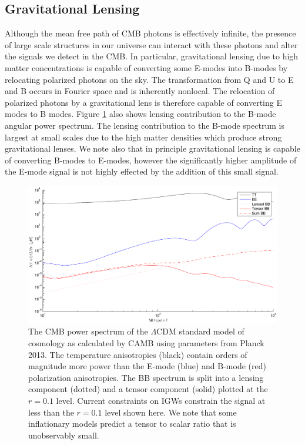 \documentclass[12pt]{article}
\begin{document}
\subsection{Gravitational Lensing}
Although the mean free path of CMB photons is effectively infinite, the
presence of large scale structures in our universe can interact with these
photons and alter the signals we detect in the CMB. In particular,
gravitational lensing due to high matter concentrations is capable of
converting some E-modes into B-modes by relocating polarized photons on the
sky. The transformation from Q and U to E and B occurs in Fourier space and is
inherently nonlocal. The relocation of polarized photons by a gravitational
lens is therefore capable of converting E modes to B modes.
Figure \ref{fig:theory_aps} also shows lensing contribution to the
B-mode angular power spectrum. The lensing contribution to the B-mode spectrum
is largest at small scales due to the high matter densities which produce
strong gravitational lenses. We note also that in principle gravitational
lensing is capable of converting B-modes to E-modes, however the significantly
higher amplitude of the E-mode signal is not highly effected by the addition
of this small signal.



\begin{figure}[ht]
	\center
	\includegraphics[width=.8\textwidth]{theory_aps.pdf}
	\caption{The CMB power spectrum of the $\Lambda$CDM standard model of
	cosmology as calculated by CAMB using parameters from Planck 2013. The
	temperature anisotropies (black) contain orders of magnitude more power
	than the E-mode (blue) and B-mode (red) polarization anisotropies. The BB
	spectrum is split into a lensing component (dotted) and a tensor component
	(solid) plotted at the $r=0.1$ level. Current constraints on  IGWs
	constrain the signal at less than the $r=0.1$ level shown here. We note
	that some inflationary models predict a tensor to scalar ratio that is
	unobservably small.}
	\label{fig:theory_aps}

\end{figure}
\end{document}
